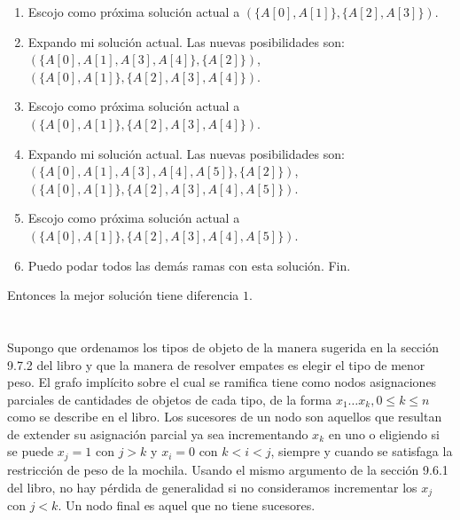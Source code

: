 \documentclass{article}
\begin{document}
\begin{enumerate}
\begin{enumerate}
\item Escojo como próxima solución actual a $(\{A[0],A[1]\},\{A[2],A[3]\})$.

\item Expando mi solución actual. Las nuevas posibilidades son: \\
$(\{A[0],A[1],A[3],A[4]\},\{A[2]\})$,\\
$(\{A[0],A[1]\},\{A[2],A[3],A[4]\})$.

\item Escojo como próxima solución actual a\\
$(\{A[0],A[1]\},\{A[2],A[3],A[4]\})$.

\item Expando mi solución actual. Las nuevas posibilidades son: \\
$(\{A[0],A[1],A[3],A[4],A[5]\},\{A[2]\})$,\\
$(\{A[0],A[1]\},\{A[2],A[3],A[4],A[5]\})$.

\item Escojo como próxima solución actual a \\
$(\{A[0],A[1]\},\{A[2],A[3],A[4],A[5]\})$.

\item Puedo podar todos las demás ramas con esta solución. Fin.

\end{enumerate}

Entonces la mejor solución tiene diferencia $1$.

\end{enumerate}

\section{}

Supongo que ordenamos los tipos de objeto de la manera sugerida en la sección 9.7.2 del libro y que la manera
de resolver empates es elegir el tipo de menor peso.
El grafo implícito sobre el cual se ramifica tiene como nodos asignaciones parciales de cantidades
de objetos de cada tipo, de la forma $x_1 \ldots x_k, 0 \leq k \leq n$ como se describe en el libro. Los sucesores
de un nodo son aquellos que resultan de extender su asignación parcial ya sea incrementando $x_k$ en uno o
eligiendo si se puede $x_j = 1$ con $j > k$ y $x_i = 0$ con $k < i < j$, siempre y cuando se satisfaga la 
restricción de peso de la mochila.
Usando el mismo argumento de la sección 9.6.1 del libro, no hay pérdida de generalidad
si no consideramos incrementar los $x_j$ con $j < k$. Un nodo final es aquel que no tiene sucesores.
\end{document}
